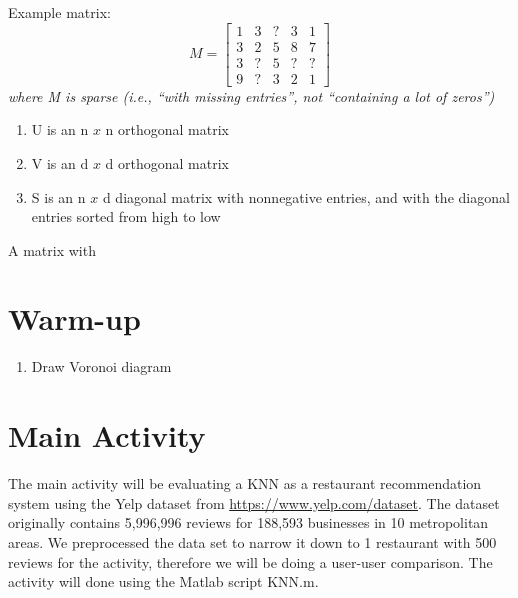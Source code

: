 \documentclass{report}
\begin{document}
Example matrix:
			\[
     			M=
  				\begin{bmatrix}
    					1 & 3 & ? & 3 & 1 \\
    					3 & 2 & 5 & 8 & 7 \\
    					3 & ? & 5 & ? & ? \\
    					9 & ? & 3 & 2 & 1
  				\end{bmatrix}
			\]
			\textit{ where M is sparse (i.e., “with missing entries”, not “containing a lot of zeros”)}
			
			
			\begin{enumerate}
				\item U is an n $x$ n orthogonal matrix
				\item V is an d $x$ d orthogonal matrix
				\item S is an n $x$ d diagonal matrix with nonnegative entries, and with the diagonal entries
sorted from high to low 
			\end{enumerate}
			
			A matrix with 
			

		
		\begin{algorithm}

		\end{algorithm}
		
\section*{Warm-up}

\begin{enumerate}

\item Draw Voronoi diagram
	
\end{enumerate}

\section*{Main Activity}

The main activity will be evaluating a KNN as a restaurant recommendation system using the Yelp dataset from \href{https://www.yelp.com/dataset}{https://www.yelp.com/dataset}.
The dataset originally contains 5,996,996 reviews for 188,593 businesses in 10 metropolitan areas.
We preprocessed the data set to narrow it down to 1 restaurant with 500 reviews for the activity, therefore we will be doing a user-user comparison.  
The activity will done using the Matlab script KNN.m.
\end{document}
